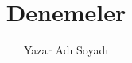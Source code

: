 \documentclass[english]{book}
\begin{document}
\title{Denemeler}
\author{Yazar Adı Soyadı}
\maketitle
%
\mainmatter
\tableofcontents
%
{



}
{

}
\end{document}
